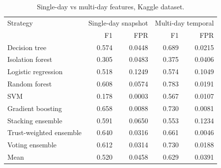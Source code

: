 \begin{table}[H]
\centering
\small
\begin{tabular}{lrrrr}
\toprule
Strategy & \multicolumn{2}{c}{Single-day snapshot} & \multicolumn{2}{c}{Multi-day temporal} \\
 & F1 & FPR & F1 & FPR \\
\midrule
Decision tree & 0.574 & 0.0448 & 0.689 & 0.0215 \\
Isolation forest & 0.305 & 0.0483 & 0.375 & 0.0406 \\
Logistic regression & 0.518 & 0.1249 & 0.574 & 0.1049 \\
Random forest & 0.608 & 0.0574 & 0.783 & 0.0191 \\
SVM & 0.178 & 0.0003 & 0.567 & 0.0107 \\
Gradient boosting & 0.658 & 0.0088 & 0.730 & 0.0081 \\
Stacking ensemble & 0.591 & 0.0650 & 0.553 & 0.1234 \\
Trust-weighted ensemble & 0.640 & 0.0316 & 0.661 & 0.0046 \\
Voting ensemble & 0.612 & 0.0314 & 0.730 & 0.0188 \\
\midrule
Mean & 0.520 & 0.0458 & 0.629 & 0.0391 \\
\bottomrule
\end{tabular}
\caption{Single-day vs multi-day features, Kaggle dataset.}
\label{tab:ablation-kaggle}
\end{table}
